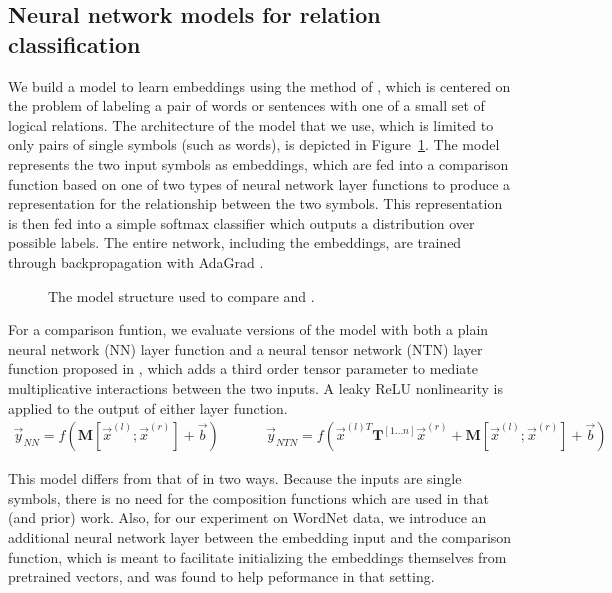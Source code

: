 
\subsection*{Neural network models for relation classification} \label{methods}



We build a model to learn embeddings using the method of
\citet{Bowman:Potts:Manning:2014}, which is centered on the problem of
labeling a pair of words or sentences with one of a small set of
logical relations. The architecture of the model that we use, which is
limited to only pairs of single symbols (such as words), is depicted
in Figure~\ref{sample-figure}. The model represents the two input
symbols as embeddings, which are fed into a comparison function based
on one of two types of neural network layer functions to produce a
representation for the relationship between the two symbols. This
representation is then fed into a simple softmax classifier which
outputs a distribution over possible labels. The entire network,
including the embeddings, are trained through backpropagation with
AdaGrad \cite{duchi2011adaptive}.

\begin{figure}[tp]
  \centering
  
  \caption{The model structure used to compare  and .} 
  \label{sample-figure}
\end{figure}


For a comparison funtion, we evaluate versions of the model with both a plain neural
network (NN) layer function and a neural tensor network (NTN) layer function
proposed in \citet{chen2013learning}, which adds a third order tensor parameter
to mediate multiplicative interactions between the two inputs. A leaky ReLU
nonlinearity \cite{maasrectifier} is applied to the output of either
layer function.
%
\begin{gather} \label{rnn}
\vec{y}_{\textit{NN}} = f(\mathbf{M} [\vec{x}^{(l)}; \vec{x}^{(r)}] + \vec{b}) ~~~~~~~~~~~~~~~ \vec{y}_{\textit{NTN}} = f(\vec{x}^{(l)T} \mathbf{T}^{[1 \ldots n]} \vec{x}^{(r)} + \mathbf{M} [\vec{x}^{(l)}; \vec{x}^{(r)}] + \vec{b})
\end{gather} 
%

This model differs from that of \citet{Bowman:Potts:Manning:2014} in two ways. Because 
the inputs are single symbols, there is no need for the composition functions
which are used in that (and prior) work. Also, for our experiment on 
WordNet data, we introduce an additional neural network layer between the embedding input
and the comparison function, which is meant to facilitate initializing the embeddings
themselves from pretrained vectors, and was found to help peformance in that setting.


